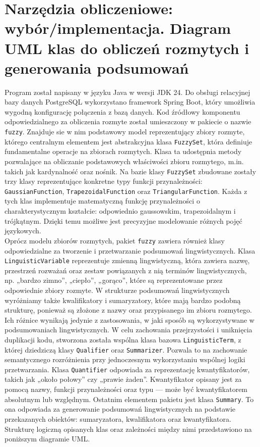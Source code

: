 \documentclass{article}
\begin{document}
\section{Narzędzia obliczeniowe: wybór/implementacja. Diagram UML klas do obliczeń rozmytych i generowania podsumowań}
Program został napisany w języku Java w wersji JDK 24. Do obsługi relacyjnej bazy danych PostgreSQL wykorzystano framework Spring Boot, który umożliwia wygodną konfigurację połączenia z bazą danych. Kod źródłowy komponentu odpowiedzialnego za obliczenia rozmyte został umieszczony w pakiecie o nazwie \texttt{fuzzy}. Znajduje sie w nim podstawowy model reprezentujący zbiory rozmyte, którego centralnym elementem jest abstrakcyjna klasa \texttt{FuzzySet}, która definiuje fundamentalne operacje na zbiorach rozmytych. Klasa ta udostępnia metody pozwalające na obliczanie podstawowych właściwości zbioru rozmytego, m.in. takich jak kardynalność oraz nośnik. Na bazie klasy \texttt{FuzzySet} zbudowane zostały trzy klasy reprezentujące konkretne typy funkcji przynależności: \texttt{GaussianFunction}, \texttt{TrapezoidalFunction} oraz \texttt{TriangularFunction}. Każda z tych klas implementuje matematyczną funkcję przynależności o charakterystycznym kształcie: odpowiednio gaussowskim, trapezoidalnym i trójkątnym. Dzięki temu możliwe jest precyzyjne modelowanie różnych pojęć językowych. \\
Oprócz modelu zbiorów rozmytych, pakiet \texttt{fuzzy} zawiera również klasy odpowiedzialne za tworzenie i przetwarzanie podsumowań lingwistycznych. Klasa \texttt{LinguisticVariable} reprezentuje zmienną lingwistyczną, która zawiera nazwę, przestrzeń rozważań oraz zestaw powiązanych z nią terminów lingwistycznych, np. „bardzo zimno”, „ciepło”, „gorąco”, które są reprezentowane przez odpowiednie zbiory rozmyte.
W strukturze podsumowań lingwistycznych wyróżniamy także kwalifikatory i sumaryzatory, które mają bardzo podobną strukturę, ponieważ są złożone z nazwy oraz przypisanego im zbioru rozmytego. Ich różnice wynikają jedynie z zastosowania, w jaki sposób są wykorzystywane w podsumowaniach lingwistycznych. W celu zachowania przejrzystości i uniknięcia duplikacji kodu, stworzona została wspólna klasa bazowa \texttt{LinguisticTerm}, z której dziedziczą klasy \texttt{Qualifier} oraz \texttt{Summarizer}. Pozwala to na zachowanie semantycznego rozróżnienia przy jednoczesnym wykorzystaniu wspólnej logiki przetwarzania.
Klasa \texttt{Quantifier} odpowiada za reprezentację kwantyfikatorów, takich jak „około połowy” czy „prawie żaden”. Kwantyfikator opisany jest za pomocą nazwy, funkcji przynależności oraz typu — może być kwantyfikatorem absolutnym lub względnym.
Ostatnim elementem pakietu jest klasa \texttt{Summary}. To ona odpowiada za generowanie podsumowań lingwistycznych na podstawie przekazanych obiektów: sumaryzatora, kwalifikatora oraz kwantyfikatora. \\
Strukturę logiczną opisanych klas oraz zależności między nimi przedstawiono na poniższym diagramie UML.
\end{document}
